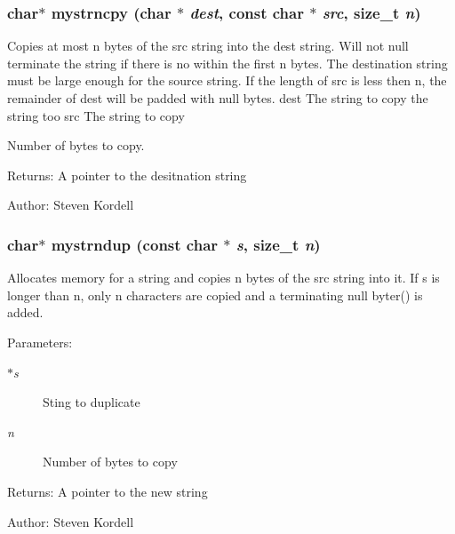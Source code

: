 \subsubsection{\setlength{\rightskip}{0pt plus 5cm}char$\ast$ mystrncpy (char $\ast$ {\em dest}, const char $\ast$ {\em src}, size\_\-t {\em n})}\label{mystringbackup_8c_f8122b3dfcb26b56ac0505030e95adc5}


Copies at most n bytes of the src string into the dest string. Will not null terminate the string if there is no  within the first n bytes. The destination string must be large enough for the source string. If the length of src is less then n, the remainder of dest will be padded with null bytes.  dest The string to copy the string too  src The string to copy \par
 Number of bytes to copy. \begin{Desc}
\item[Returns:]A pointer to the desitnation string \end{Desc}
\begin{Desc}
\item[Author:]Steven Kordell \end{Desc}
\subsubsection{\setlength{\rightskip}{0pt plus 5cm}char$\ast$ mystrndup (const char $\ast$ {\em s}, size\_\-t {\em n})}\label{mystringbackup_8c_d13d3e42cbb0fb06a9c5070850679f8f}


Allocates memory for a string and copies n bytes of the src string into it. If s is longer than n, only n characters are copied and a terminating null byter() is added. \begin{Desc}
\item[Parameters:]
\begin{description}
\item[{\em $\ast$s}]Sting to duplicate \item[{\em n}]Number of bytes to copy \end{description}
\end{Desc}
\begin{Desc}
\item[Returns:]A pointer to the new string \end{Desc}
\begin{Desc}
\item[Author:]Steven Kordell \end{Desc}
